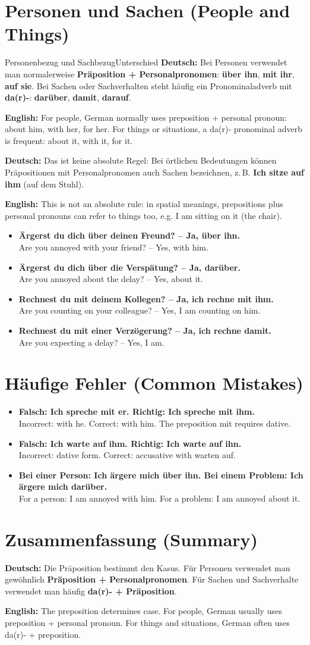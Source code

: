 \documentclass[a4paper,11pt]{article}
\newcommand{\GermanText}[1]{\textbf{Deutsch: }#1\par}
\newcommand{\EnglishText}[1]{{\small\color{SoftGray}\textbf{English: }#1\par}}
\newcommand{\ExampleItem}[2]{\item \textbf{#1}\\{\small\color{SoftGray}#2}}
\begin{document}
\section{Personen und Sachen (People and Things)}
\begin{grammarentry}{Personenbezug und Sachbezug}{Unterschied}
\GermanText{Bei Personen verwendet man normalerweise \textbf{Präposition + Personalpronomen}: \textbf{über ihn}, \textbf{mit ihr}, \textbf{auf sie}. Bei Sachen oder Sachverhalten steht häufig ein Pronominaladverb mit \textbf{da(r)-}: \textbf{darüber}, \textbf{damit}, \textbf{darauf}.}
\EnglishText{For people, German normally uses preposition + personal pronoun: about him, with her, for her. For things or situations, a da(r)- pronominal adverb is frequent: about it, with it, for it.}
\GermanText{Das ist keine absolute Regel: Bei örtlichen Bedeutungen können Präpositionen mit Personalpronomen auch Sachen bezeichnen, z.\,B. \textbf{Ich sitze auf ihm} (auf dem Stuhl).}
\EnglishText{This is not an absolute rule: in spatial meanings, prepositions plus personal pronouns can refer to things too, e.g. I am sitting on it (the chair).}
\end{grammarentry}
\begin{exbox}\begin{itemize}
\ExampleItem{Ärgerst du dich über deinen Freund? -- Ja, über ihn.}{Are you annoyed with your friend? -- Yes, with him.}
\ExampleItem{Ärgerst du dich über die Verspätung? -- Ja, darüber.}{Are you annoyed about the delay? -- Yes, about it.}
\ExampleItem{Rechnest du mit deinem Kollegen? -- Ja, ich rechne mit ihm.}{Are you counting on your colleague? -- Yes, I am counting on him.}
\ExampleItem{Rechnest du mit einer Verzögerung? -- Ja, ich rechne damit.}{Are you expecting a delay? -- Yes, I am.}
\end{itemize}\end{exbox}
\section{Häufige Fehler (Common Mistakes)}
\begin{exbox}\begin{itemize}
\ExampleItem{Falsch: Ich spreche mit er. \quad Richtig: Ich spreche mit ihm.}{Incorrect: with he. Correct: with him. The preposition mit requires dative.}
\ExampleItem{Falsch: Ich warte auf ihm. \quad Richtig: Ich warte auf ihn.}{Incorrect: dative form. Correct: accusative with warten auf.}
\ExampleItem{Bei einer Person: Ich ärgere mich über ihn. \quad Bei einem Problem: Ich ärgere mich darüber.}{For a person: I am annoyed with him. For a problem: I am annoyed about it.}
\end{itemize}\end{exbox}
\section{Zusammenfassung (Summary)}
\GermanText{Die Präposition bestimmt den Kasus. Für Personen verwendet man gewöhnlich \textbf{Präposition + Personalpronomen}. Für Sachen und Sachverhalte verwendet man häufig \textbf{da(r)- + Präposition}.}
\EnglishText{The preposition determines case. For people, German usually uses preposition + personal pronoun. For things and situations, German often uses da(r)- + preposition.}
\end{document}
